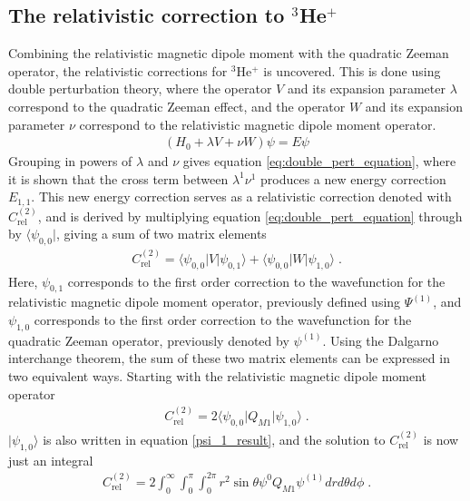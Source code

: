         \subsection{The relativistic correction to $^3$He$^+$}\label{sec:Relativistic_Correction}
            Combining the relativistic magnetic dipole moment with the quadratic Zeeman operator, the relativistic corrections for $^3$He$^+$ is uncovered. This is done using double perturbation theory, where the operator $V$ and its expansion parameter $\lambda$ correspond to the quadratic Zeeman effect, and the operator $W$ and its expansion parameter $\nu$ correspond to the relativistic magnetic dipole moment operator.
            \begin{align}
                \left(H_0 + \lambda V + \nu W \right) \psi = E \psi
            \end{align}
            \noindent Grouping in powers of $\lambda$ and $\nu$ gives equation \eqref{eq:double_pert_equation}, where it is shown that the cross term between $\lambda^1 \nu^1$ produces a new energy correction $E_{1,1}$. This new energy correction serves as a relativistic correction denoted with $C_{\text{rel}}^{(2)}$, and is derived by multiplying equation \eqref{eq:double_pert_equation} through by $\langle \psi_{0,0} \vert$, giving a sum of two matrix elements
            \begin{align}
                C_{\text{rel}}^{(2)} = \langle \psi_{0,0} \vert V \vert \psi_{0,1} \rangle + \langle \psi_{0,0} \vert W \vert \psi_{1,0} \rangle\;. \label{eq:REL}
            \end{align}
            \noindent Here, $\psi_{0,1}$ corresponds to the first order correction to the wavefunction for the relativistic magnetic dipole moment operator, previously defined using $\varPsi^{(1)}$, and $\psi_{1,0}$ corresponds to the first order correction to the wavefunction for the quadratic Zeeman operator, previously denoted by $\psi^{(1)}$. Using the Dalgarno interchange theorem, the sum of these two matrix elements can be expressed in two equivalent ways. Starting with the relativistic magnetic dipole moment operator
            \begin{align}
                C_{\text{rel}}^{(2)} = 2\langle \psi_{0,0} \vert Q_{M1} \vert \psi_{1,0} \rangle\;.
            \end{align}
            \noindent $\vert \psi_{1,0} \rangle$ is also written in equation \eqref{psi_1_result}, and the solution to $C_{\text{rel}}^{(2)}$ is now just an integral 
            \begin{align}
                C_{\text{rel}}^{(2)} = 2\int_0^\infty \int_0^\pi \int_0^{2\pi} r^2 \sin\theta \psi^0 Q_{M1} \psi^{(1)} dr d\theta d\phi\;.
            \end{align}
